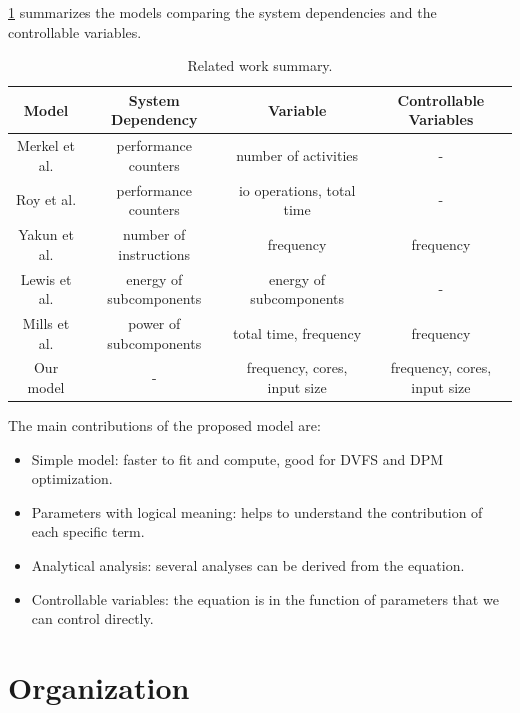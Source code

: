 \cref{tab:related_work} summarizes the models comparing the system dependencies and the controllable variables.
\begin{table}[H]
	\footnotesize
	\caption{Related work summary.\label{tab1}}
	\setlength{\tabcolsep}{2.3mm}\begin{tabular}{cccc}
		\toprule
		
		\textbf{Model}  & \textbf{System Dependency}       & \textbf{Variable}                     & \textbf{Controllable Variables}         \\ \midrule
		Merkel et al. \cite{Merkel2006BalancingSystems} & performance counters    & number of activities & - \\
		Roy et al. \cite{Roy2013AnAlgorithms}&performance counters &io operations, total time    & - \\
		Yakun et al. \cite{Shao2013EnergyProcessor}&number of instructions &frequency&frequency \\
		Lewis et al. \cite{Lewis2008Run-timeSystems}&energy of subcomponents&energy of subcomponents & - \\
		Mills et al. \cite{Mills2014EnergySystems}&power of subcomponents&total time, frequency & frequency \\ 
		Our model & - & frequency, cores, input size & frequency, cores, input size\\ \bottomrule
	\end{tabular}
	\label{tab:related_work}
\end{table}

The main contributions of the proposed model are:


\begin{itemize}
	\item Simple model: faster to fit and compute, good for DVFS and DPM optimization.
	\item Parameters with logical meaning: helps to understand the contribution of each specific term.
	\item Analytical analysis: several analyses can be derived from the equation.
	\item Controllable variables: the equation is in the function of parameters that we can control directly.
\end{itemize}

\section{Organization}